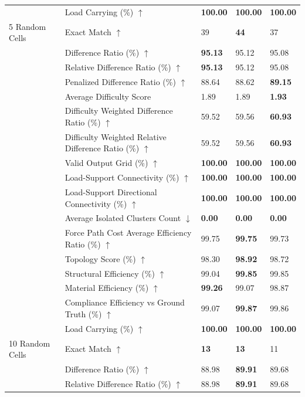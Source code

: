 \begin{table}[!h]
{\begin{tabular}{lllll}
 & Load Carrying (\%) $\uparrow$ & \textbf{100.00} & \textbf{100.00} & \textbf{100.00} \\
5 Random Cells & Exact Match $\uparrow$ & 39 & \textbf{44} & 37 \\
 & Difference Ratio (\%) $\uparrow$ & \textbf{95.13} & 95.12 & 95.08 \\
 & Relative Difference Ratio (\%) $\uparrow$ & \textbf{95.13} & 95.12 & 95.08 \\
 & Penalized Difference Ratio (\%) $\uparrow$ & 88.64 & 88.62 & \textbf{89.15} \\
 & Average Difficulty Score & 1.89 & 1.89 & \textbf{1.93} \\
 & Difficulty Weighted Difference Ratio (\%) $\uparrow$ & 59.52 & 59.56 & \textbf{60.93} \\
 & Difficulty Weighted Relative Difference Ratio (\%) $\uparrow$ & 59.52 & 59.56 & \textbf{60.93} \\
 & Valid Output Grid (\%) $\uparrow$ & \textbf{100.00} & \textbf{100.00} & \textbf{100.00} \\
 & Load-Support Connectivity (\%) $\uparrow$ & \textbf{100.00} & \textbf{100.00} & \textbf{100.00} \\
 & Load-Support Directional Connectivity (\%) $\uparrow$ & \textbf{100.00} & \textbf{100.00} & \textbf{100.00} \\
 & Average Isolated Clusters Count $\downarrow$ & \textbf{0.00} & \textbf{0.00} & \textbf{0.00} \\
 & Force Path Cost Average Efficiency Ratio (\%) $\uparrow$ & 99.75 & \textbf{99.75} & 99.73 \\
 & Topology Score (\%) $\uparrow$ & 98.30 & \textbf{98.92} & 98.72 \\
 & Structural Efficiency (\%) $\uparrow$ & 99.04 & \textbf{99.85} & 99.85 \\
 & Material Efficiency (\%) $\uparrow$ & \textbf{99.26} & 99.07 & 98.87 \\
 & Compliance Efficiency vs Ground Truth (\%) $\uparrow$ & 99.07 & \textbf{99.87} & 99.86 \\
 & Load Carrying (\%) $\uparrow$ & \textbf{100.00} & \textbf{100.00} & \textbf{100.00} \\
10 Random Cells & Exact Match $\uparrow$ & \textbf{13} & \textbf{13} & 11 \\
 & Difference Ratio (\%) $\uparrow$ & 88.98 & \textbf{89.91} & 89.68 \\
 & Relative Difference Ratio (\%) $\uparrow$ & 88.98 & \textbf{89.91} & 89.68 \\

\end{tabular}}
\end{table}
